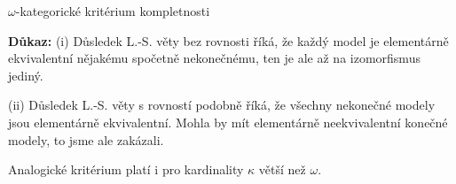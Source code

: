 \documentclass{beamer}
\begin{document}
\begin{frame}{$\omega$-kategorické kritérium kompletnosti}


    \pause

    \pause
    \textbf{Důkaz:}\pause
    \alert{(i)} Důsledek L.-S. věty bez rovnosti říká, že každý model je elementárně ekvivalentní nějakému spočetně nekonečnému, ten je ale až na izomorfismus jediný.\pause
    
    \alert{(ii)} \pause Důsledek L.-S. věty s rovností podobně říká, že všechny nekonečné modely jsou elementárně ekvivalentní. Mohla by mít elementárně neekvivalentní konečné modely, to jsme ale zakázali. \hfill\qedsymbol

    \medskip

    \pause

    \pause
    Analogické kritérium platí i pro kardinality $\kappa$ větší než $\omega$.

\end{frame}
\end{document}
